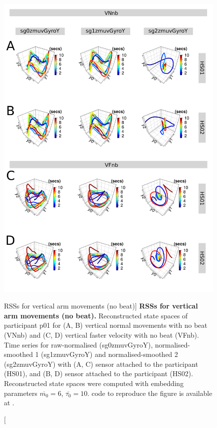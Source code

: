 \begin{figure}
\centering
\includegraphics[height=0.8\textheight]{fig_5_07}
\caption
	[RSSs for vertical arm movements (no beat)]{
	{\bf RSSs for vertical arm movements (no beat).}
	Reconstructed state spaces of participant p01 for 
	(A, B) vertical normal movements with no beat (VNnb) and 
	(C, D) vertical faster velocity with no beat (VFnb).
	Time series for raw-normalised (sg0zmuvGyroY), 
	normalised-smoothed 1 (sg1zmuvGyroY) and 
	normalised-smoothed 2 (sg2zmuvGyroY) with
	(A, C) sensor attached to the participant (HS01), and
	(B, D) sensor attached to the participant (HS02).	
	Reconstructed state spaces were computed with 
	embedding parameters $\overline{m_0}=6$, $\overline{\tau_0}=10$.
	\R code to reproduce the figure is available at 
	.
        }
     \label{fig:rss_Vnb_w500}
\end{figure}

